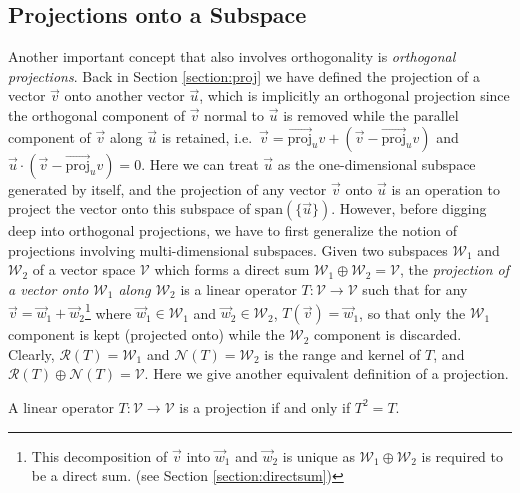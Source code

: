 \subsection{Projections onto a Subspace}

Another important concept that also involves orthogonality is \textit{orthogonal projections}. Back in Section \ref{section:proj} we have defined the projection of a vector $\vec{v}$ onto another vector $\vec{u}$, which is implicitly an orthogonal projection since the orthogonal component of $\vec{v}$ normal to $\vec{u}$ is removed while the parallel component of $\vec{v}$ along $\vec{u}$ is retained, i.e.\ $\vec{v} = \overrightarrow{\text{proj}}_u v + (\vec{v} - \overrightarrow{\text{proj}}_u v)$ and $\vec{u} \cdot (\vec{v} - \overrightarrow{\text{proj}}_u v) = 0$. Here we can treat $\vec{u}$ as the one-dimensional subspace generated by itself, and the projection of any vector $\vec{v}$ onto $\vec{u}$ is an operation to project the vector onto this subspace of $\text{span}(\{\vec{u}\})$. However, before digging deep into orthogonal projections, we have to first generalize the notion of projections involving multi-dimensional subspaces. Given two subspaces $\mathcal{W}_1$ and $\mathcal{W}_2$ of a vector space $\mathcal{V}$ which forms a direct sum $\mathcal{W}_1 \oplus \mathcal{W}_2 = \mathcal{V}$, the \textit{projection of a vector onto $\mathcal{W}_1$ along $\mathcal{W}_2$} is a linear operator $T:\mathcal{V} \to \mathcal{V}$ such that for any $\vec{v} = \vec{w}_1 + \vec{w}_2$\footnote{This decomposition of $\vec{v}$ into $\vec{w}_1$ and $\vec{w}_2$ is unique as $\mathcal{W}_1 \oplus \mathcal{W}_2$ is required to be a direct sum. (see Section \ref{section:directsum})} where $\vec{w}_1 \in \mathcal{W}_1$ and $\vec{w}_2 \in \mathcal{W}_2$, $T(\vec{v}) = \vec{w}_1$, so that only the $\mathcal{W}_1$ component is kept (projected onto) while the $\mathcal{W}_2$ component is discarded. Clearly, $\mathcal{R}(T) = \mathcal{W}_1$ and $\mathcal{N}(T) = \mathcal{W}_2$ is the range and kernel of $T$, and $\mathcal{R}(T) \oplus \mathcal{N}(T) = \mathcal{V}$. Here we give another equivalent definition of a projection.
\begin{proper}[Projection]
\label{proper:matrixproj}
A linear operator $T: \mathcal{V} \to \mathcal{V}$ is a projection if and only if $T^2 = T$.
\end{proper}
